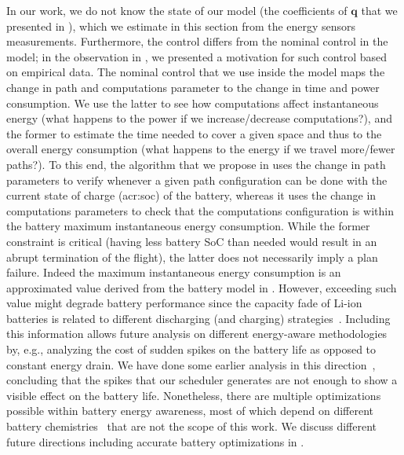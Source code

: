 In our work, we do not know the state of our model (the coefficients of $\mathbf{q}$ that we presented in ), which we estimate in this section from the energy sensors measurements. Furthermore, the control differs from the nominal control in the model; in the observation in , we presented a motivation for such control based on empirical data. The nominal control that we use inside the model maps the change in path and computations parameter to the change in time and power consumption. We use the latter to see how computations affect instantaneous energy (what happens to the power if we increase/decrease computations?), and the former to estimate the time needed to cover a given space and thus to the overall energy consumption (what happens to the energy if we travel more/fewer paths?). To this end, the algorithm that we propose in  uses the change in path parameters to verify whenever a given path configuration can be done with the current state of charge (\Gls{acr:soc}) of the battery, whereas it uses the change in computations parameters to check that the computations configuration is within the battery maximum instantaneous energy consumption. While the former constraint is critical (having less battery SoC than needed would result in an abrupt termination of the flight), the latter does not necessarily imply a plan failure. Indeed the maximum instantaneous energy consumption is an approximated value derived from the battery model in . However, exceeding such value might degrade battery performance since the capacity fade of Li-ion batteries is related to different discharging (and charging) strategies~\citep{lv2020analysis,tian2019quantifying}. Including this information allows future analysis on different energy-aware methodologies by, e.g., analyzing the cost of sudden spikes on the battery life as opposed to constant energy drain. We have done some earlier analysis in this direction~\citep{seewald2019coarse}, concluding that the spikes that our scheduler generates are not enough to show a visible effect on the battery life. Nonetheless, there are multiple optimizations possible within battery energy awareness, most of which depend on different battery chemistries~\citep{tian2019quantifying} that are not the scope of this work. We discuss different future directions including accurate battery optimizations in .

